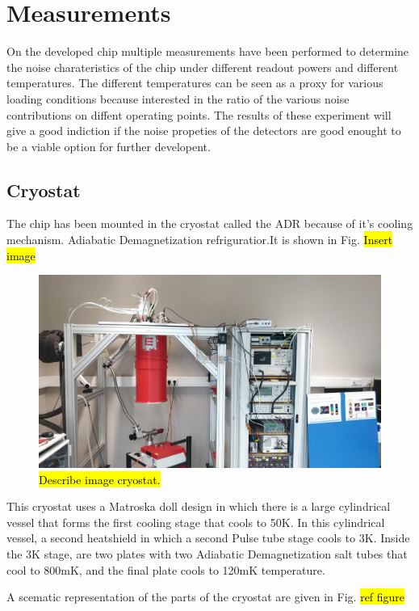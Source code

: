 \chapter{Measurements}
On the developed chip multiple measurements have been performed to determine the noise charateristics of the chip under different readout powers and different temperatures. The different temperatures can be seen as a proxy for various loading conditions because interested in the ratio of the various noise contributions on diffent operating points. The results of these experiment will give a good indiction if the noise propeties of the detectors are good enought to be a viable option for further developent.
\section{Cryostat}
The chip has been mounted in the cryostat called the ADR because of it's cooling mechanism. Adiabatic Demagnetization refriguratior.It is shown in Fig. \hl{Insert image}

\begin{figure}[ht]
	\centering
	\includegraphics[width=.70\linewidth]{figures/ch5_measurement/ADR_OverviewV1.jpg}
	\caption{\hl{Describe image cryostat.}}
	\label{fig:ch6_ADR_image}
\end{figure}

This cryostat uses a Matroska doll design in which there is a large cylindrical vessel that forms the first cooling stage that cools to 50K. In this cylindrical vessel, a second heatshield in which a second Pulse tube stage cools to 3K. Inside the 3K stage, are two plates with two Adiabatic Demagnetization salt tubes that cool to 800mK, and the final plate cools to 120mK temperature.

A scematic representation of the parts of the cryostat are given in Fig. \hl{ref figure}


